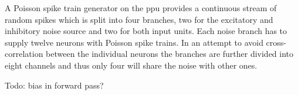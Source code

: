 A Poisson spike train generator on the \gls{ppu} provides a continuous stream of random spikes which is split into four branches, two for the excitatory and inhibitory noise source and two for both input units. Each noise branch has to supply twelve neurons with Poisson spike trains. In an attempt to avoid cross-correlation between the individual neurons the branches are further divided into eight channels and thus only four will share the noise with other ones.

Todo: bias in forward pass?




